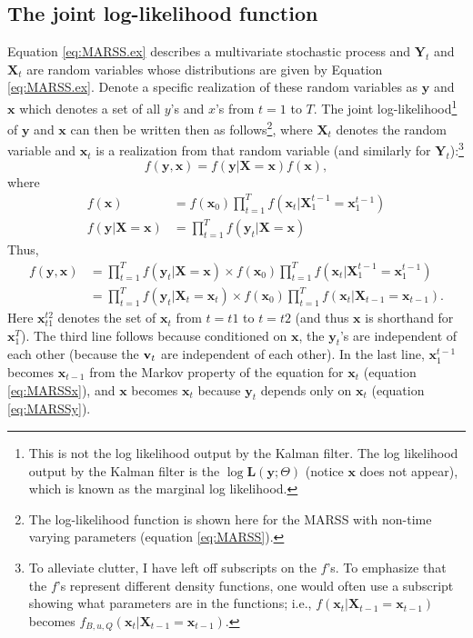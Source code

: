 \documentclass[]{article}
\def\LL{\mbox{$\mathbf L$}}	\def\ll{\mbox{$\mathbf l$}}
\def\XX{\mbox{$\pmb{X}$}}	\def\xx{\mbox{$\pmb{x}$}}
\def\YY{\mbox{$\pmb{Y}$}}	\def\yy{\mbox{$\pmb{y}$}}
\begin{document}
\subsection{The joint log-likelihood function}
Equation \ref{eq:MARSS.ex} describes a multivariate stochastic process and $\YY_t$ and $\XX_t$ are random variables whose distributions are given by Equation \ref{eq:MARSS.ex}. Denote a specific realization of these random variables as $\yy$ and $\xx$ which denotes a set of all $y$'s and $x$'s from $t=1$ to $T$. The joint log-likelihood\footnote{This is not the log likelihood output by the Kalman filter.  The log likelihood output by the Kalman filter is the $\log\LL(\yy;\Theta)$ (notice $\xx$ does not appear), which is known as the marginal log likelihood.} of $\yy$ and $\xx$ can then be written then as follows\footnote{The log-likelihood function is shown here for the MARSS with non-time varying parameters (equation \ref{eq:MARSS}).}, where $\XX_t$ denotes the random variable and $\xx_t$ is a realization from that random variable (and similarly for $\YY_t$):\footnote{To alleviate clutter, I have left off subscripts on the $f$'s.  To emphasize that the $f$'s represent different density functions, one would often use a subscript showing what parameters are in the functions; i.e., $f(\xx_t|\XX_{t-1}=\xx_{t-1})$ becomes $f_{B,u,Q}(\xx_t|\XX_{t-1}=\xx_{t-1})$.}
\begin{equation}
f(\yy,\xx) = f(\yy|\XX=\xx)f(\xx),
\end{equation}
where
\begin{equation}
\begin{split}
f(\xx)&=f(\xx_0)\prod_{t=1}^T f(\xx_t|\XX_1^{t-1}=\xx_1^{t-1})\\
f(\yy|\XX=\xx) &= \prod_{t=1}^T f(\yy_t|\XX=\xx)
\end{split}
\end{equation}
Thus,
\begin{equation}\label{eq:jointL}
\begin{split}f(\yy,\xx) &= \prod_{t=1}^T f(\yy_t|\XX=\xx) \times f(\xx_0)\prod_{t=1}^T f(\xx_t|\XX_1^{t-1}=\xx_1^{t-1}) \\
&=\prod_{t=1}^T f(\yy_t|\XX_t=\xx_t) \times f(\xx_0)\prod_{t=1}^T f(\xx_t|\XX_{t-1}=\xx_{t-1}).
\end{split}
\end{equation}
Here $\xx_{t1}^{t2}$ denotes the set of $\xx_t$ from $t=t1$ to $t=t2$ (and thus $\xx$ is shorthand for $\xx_1^T$).  The third line follows because conditioned on $\xx$, the $\yy_t$'s are independent of each other (because the $\mbox{$\mathbf v$}_t$ are independent of each other).  In the last line, $\xx_1^{t-1}$ becomes $\xx_{t-1}$ from the Markov property of the equation for $\xx_t$ (equation \ref{eq:MARSSx}), and $\xx$ becomes $\xx_t$ because $\yy_t$ depends only on $\xx_t$ (equation \ref{eq:MARSSy}).
\end{document}
